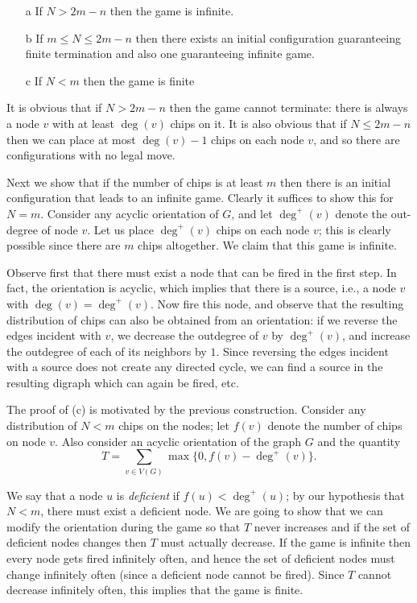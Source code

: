 \sol 

\begin{itemize}
    \item[a] If $N > 2m - n$ then the game is infinite.
    \item[b] If $m \leq N \leq 2m - n$ then there exists an initial configuration guaranteeing finite termination and also one guaranteeing infinite game.
    \item[c] If $N < m$ then the game is finite
\end{itemize}

It is obvious that if $N > 2m-n$ then the game cannot terminate: there is always a node $v$ with at least $\deg(v)$ chips on it. It is also obvious that if $N \leq 2m-n$ then we can place at most $\deg(v)-1$ chips on each node $v$, and so there are configurations with no legal move.

Next we show that if the number of chips is at least $m$ then there is an initial configuration that leads to an infinite game. Clearly it suffices to show this for $N=m$. Consider any acyclic orientation of $G$, and let $\deg^+(v)$ denote the out-degree of node $v$. Let us place $\deg^+(v)$ chips on each node $v$; this is clearly possible since there are $m$ chips altogether. We claim that this game is infinite.

Observe first that there must exist a node that can be fired in the first step. In fact, the orientation is acyclic, which implies that there is a source, i.e., a node $v$ with $\deg(v) = \deg^+(v)$. Now fire this node, and observe that the resulting distribution of chips can also be obtained from an orientation: if we reverse the edges incident with $v$, we decrease the outdegree of $v$ by $\deg^+(v)$, and increase the outdegree of each of its neighbors by $1$. Since reversing the edges incident with a source does not create any directed cycle, we can find a source in the resulting digraph which can again be fired, etc.

The proof of (c) is motivated by the previous construction. Consider any distribution of $N < m$ chips on the nodes; let $f(v)$ denote the number of chips on node $v$. Also consider an acyclic orientation of the graph $G$ and the quantity \[T = \sum_{v \in V(G)}\max\{0, f(v) - \deg^+(v)\}.\]

We say that a node $u$ is \emph{deficient} if $f(u) < \deg^+(u)$; by our hypothesis that $N < m$, there must exist a deficient node. We are going to show that we can modify the orientation during the game so that $T$ never increases and if the set of deficient nodes changes then $T$ must actually decrease. If the game is infinite then every node gets fired infinitely often, and hence the set of deficient nodes must change infinitely often (since a deficient node cannot be fired). Since $T$ cannot decrease infinitely often, this implies that the game is finite.

